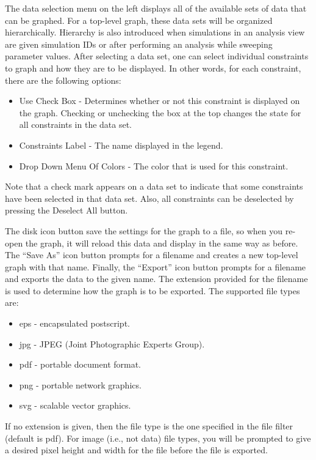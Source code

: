 \documentclass[titlepage,11pt]{article}
\begin{document}
The data selection menu on the left displays all of the
available sets of data that can be graphed.  
For a top-level graph, these
data sets will be organized hierarchically.  Hierarchy is also 
introduced when simulations in an analysis view are given
simulation IDs or after performing an analysis while sweeping parameter
values.  After selecting a data set, one can select individual constraints to 
graph and how they are to be displayed.  In other words, for each 
constraint, there are the following options: 
\begin{itemize}
\item Use Check Box - Determines
whether or not this constraint is displayed on the graph.  Checking or 
unchecking the box at the top changes the state for all constraints in
the data set. 
\item Constraints Label - The name displayed in the legend. 
\item Drop Down Menu Of Colors - The color that is used for this constraint. 
\end{itemize}
Note that a check mark appears on a data set to indicate that some
constraints have been selected in that data set.  Also, all constraints can
be deselected by pressing the Deselect All button.

The disk icon button save the settings for the graph to 
a file, so when you re-open the graph, it will reload this data and display 
in the same way as before.  The ``Save As'' icon button prompts for a 
filename and creates a new top-level graph with that name.  
Finally, the ``Export'' icon button prompts for a filename and exports
the data to the given name.  The extension provided for the filename 
is used to determine how the graph is to be exported. The
supported file types are: 
\begin{itemize}
\item eps - encapsulated postscript. 
\item jpg - JPEG (Joint Photographic Experts Group). 
\item pdf - portable document format.
\item png - portable network graphics. 
\item svg - scalable vector graphics.
\end{itemize}
If no extension is given, then the file type is the one
specified in the file filter (default is pdf).  For image (i.e.,
not data) file types, you will be prompted to give a desired
pixel height and width for the file before the file is exported. 
\end{document}
